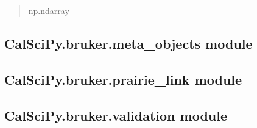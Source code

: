 \documentclass[letterpaper,10pt,english]{sphinxmanual}
\begin{document}
\begin{fulllineitems}
\label{\detokenize{CalSciPy.bruker.mark_points:CalSciPy.bruker.mark_points.generate_photostimulation_mask}}
\pysigstartsignatures
{}
\pysigstopsignatures\begin{quote}\begin{description}
\sphinxAtStartPar
np.ndarray

\end{description}\end{quote}

\end{fulllineitems}


\sphinxstepscope


\subsection{CalSciPy.bruker.meta\_objects module}
\label{\detokenize{CalSciPy.bruker.meta_objects:module-CalSciPy.bruker.meta_objects}}\label{\detokenize{CalSciPy.bruker.meta_objects:calscipy-bruker-meta-objects-module}}\label{\detokenize{CalSciPy.bruker.meta_objects::doc}}
\sphinxstepscope


\subsection{CalSciPy.bruker.prairie\_link module}
\label{\detokenize{CalSciPy.bruker.prairie_link:calscipy-bruker-prairie-link-module}}\label{\detokenize{CalSciPy.bruker.prairie_link::doc}}
\sphinxstepscope


\subsection{CalSciPy.bruker.validation module}
\label{\detokenize{CalSciPy.bruker.validation:module-CalSciPy.bruker.validation}}\label{\detokenize{CalSciPy.bruker.validation:calscipy-bruker-validation-module}}\label{\detokenize{CalSciPy.bruker.validation::doc}}
\end{document}
